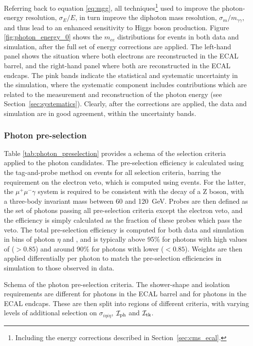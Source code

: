 Referring back to equation \ref{eq:mgg}, all techniques\footnote{Including the energy corrections described in Section~\ref{sec:cms_ecal}.} used to improve the photon-energy resolution, $\sigma_E/E$, in turn improve the diphoton mass resolution, $\sigma_m/m_{\gamma\gamma}$, and thus lead to an enhanced sensitivity to Higgs boson production. Figure \ref{fig:photon_energy_0} shows the $m_{ee}$ distributions for \Zee events in both data and simulation, after the full set of energy corrections are applied. The left-hand panel shows the situation where both electrons are reconstructed in the ECAL barrel, and the right-hand panel where both are reconstructed in the ECAL endcaps. The pink bands indicate the statistical and systematic uncertainty in the simulation, where the systematic component includes contributions which are related to the measurement and reconstruction of the photon energy (see Section~\ref{sec:systematics}). Clearly, after the corrections are applied, the data and simulation are in good agreement, within the uncertainty bands.



\subsubsection{Photon pre-selection}\label{sec:photon_preselection}
Table \ref{tab:photon_preselection} provides a schema of the selection criteria applied to the photon candidates. The pre-selection efficiency is calculated using the tag-and-probe method on \Zee events for all selection criteria, barring the requirement on the electron veto, which is computed using \Zmumug events. For the latter, the $\mu^{+}\mu^{-}\gamma$ system is required to be consistent with the decay of a Z boson, with a three-body invariant mass between 60 and 120~GeV. Probes are then defined as the set of photons passing all pre-selection criteria except the electron veto, and the efficiency is simply calculated as the fraction of these probes which pass the veto. The total pre-selection efficiency is computed for both data and simulation in bins of photon $\eta$ and \RNINE, and is typically above 95\% for photons with high values of \RNINE ($>0.85$) and around 90\% for photons with lower \RNINE ($<0.85$). Weights are then applied differentially per photon to match the pre-selection efficiencies in simulation to those observed in data.

\begin{table}[t]
    \caption[Schema of the photon pre-selection criteria]{Schema of the photon pre-selection criteria. The shower-shape and isolation requirements are different for photons in the ECAL barrel and for photons in the ECAL endcaps. These are then split into regions of different \RNINE criteria, with varying levels of additional selection on $\sigma_{i\eta i\eta}$, $\mathcal{I}_{\rm{ph}}$ and $\mathcal{I}_{\rm{tk}}$.}
    \label{tab:photon_preselection}
    \vspace{.5cm}
    \centering
    \scriptsize
    \renewcommand{\arraystretch}{1.8}
    
\end{table}



